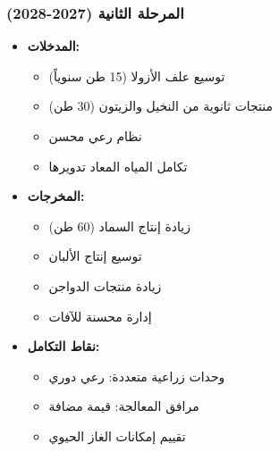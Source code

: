\subsubsection{المرحلة الثانية (2027-2028)}
\begin{itemize}
    \item \textbf{المدخلات:}
    \begin{itemize}
        \item توسيع علف الأزولا (15 طن سنوياً)
        \item منتجات ثانوية من النخيل والزيتون (30 طن)
        \item نظام رعي محسن
        \item تكامل المياه المعاد تدويرها
    \end{itemize}
    \item \textbf{المخرجات:}
    \begin{itemize}
        \item زيادة إنتاج السماد (60 طن)
        \item توسيع إنتاج الألبان
        \item زيادة منتجات الدواجن
        \item إدارة محسنة للآفات
    \end{itemize}
    \item \textbf{نقاط التكامل:}
    \begin{itemize}
        \item وحدات زراعية متعددة: رعي دوري
        \item مرافق المعالجة: قيمة مضافة
        \item تقييم إمكانات الغاز الحيوي
    \end{itemize}
\end{itemize}

